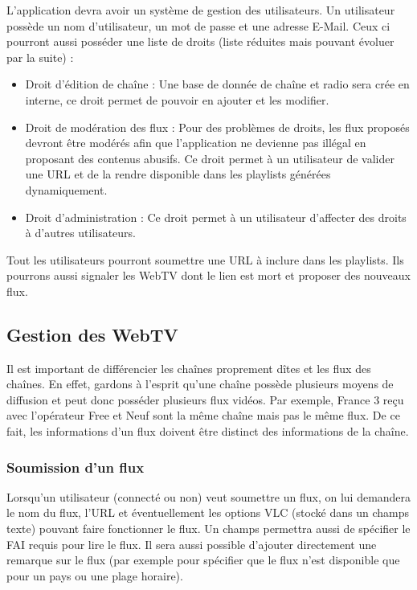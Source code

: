 \documentclass[10pt,a4paper]{article}
\begin{document}
L'application devra avoir un système de gestion des utilisateurs. Un utilisateur possède un nom d'utilisateur, un mot de passe et une adresse E-Mail.
Ceux ci pourront aussi posséder une liste de droits (liste réduites mais pouvant évoluer par la suite) :

\begin{itemize}
\item Droit d'édition de chaîne : Une base de donnée de chaîne et radio sera crée en interne, ce droit permet de pouvoir en ajouter et les modifier.
\item Droit de modération des flux : Pour des problèmes de droits, les flux proposés devront être modérés afin que l'application ne devienne pas illégal en proposant des contenus abusifs. Ce droit permet à un utilisateur de valider une URL et de la rendre disponible dans les playlists générées dynamiquement.
\item Droit d'administration : Ce droit permet à un utilisateur d'affecter des droits à d'autres utilisateurs.
\end{itemize}

Tout les utilisateurs pourront soumettre une URL à inclure dans les playlists. Ils pourrons aussi signaler les WebTV dont le lien est mort et proposer des nouveaux flux.

\subsection{Gestion des WebTV}

Il est important de différencier les chaînes proprement dîtes et les flux des chaînes. En effet, gardons à l'esprit qu'une chaîne possède plusieurs moyens de diffusion et peut donc posséder plusieurs flux vidéos. Par exemple, France 3 reçu avec l'opérateur Free et Neuf sont la même chaîne mais pas le même flux. De ce fait, les informations d'un flux doivent être distinct des informations de la chaîne.

\subsubsection{Soumission d'un flux}

Lorsqu'un utilisateur (connecté ou non) veut soumettre un flux, on lui demandera le nom du flux, l'URL et éventuellement les options VLC (stocké dans un champs texte) pouvant faire fonctionner le flux. Un champs permettra aussi de spécifier le FAI requis pour lire le flux. Il sera aussi possible d'ajouter directement une remarque sur le flux (par exemple pour spécifier que le flux n'est disponible que pour un pays ou une plage horaire).
\end{document}
